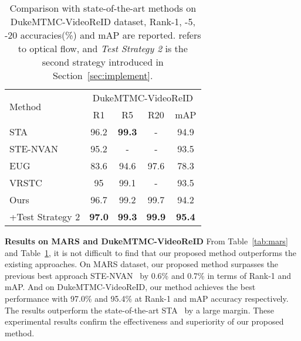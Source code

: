 \documentclass[journal]{IEEEtran}
\let\MYoriglatexcaption\caption
\renewcommand{\caption}[2][\relax]{\MYoriglatexcaption[#2]{#2}}
\begin{document}
\begin{table}[ht]
    \centering
        \begin{tabular}{ l | c | c | c | c }
            \hline
            \multirow{2}{*}{Method} & \multicolumn{4}{c}{DukeMTMC-VideoReID} \\\cline{2-5}
            & R1 & R5 & R20 & mAP\\ \hline
            STA \cite{Fu_2019_AAAI} & 96.2 & \textbf{99.3} & - & 94.9 \\
            STE-NVAN \cite{Liu_2019_BMVC} & 95.2 & - & - & 93.5 \\
            EUG\cite{Wu_2018_CVPR} & 83.6 & 94.6 & 97.6 & 78.3 \\
            VRSTC \cite{Hou_2019_CVPR}& 95 & 99.1 & - & 93.5 \\ \hline
            Ours & 96.7 & 99.2 & 99.7 & 94.2 \\
            \hspace{1em}+Test Strategy 2 & \textbf{97.0} & \textbf{99.3} & \textbf{99.9} & \textbf{95.4} \\ \hline
        \end{tabular}
        \vspace{0.5em}
    \caption{Comparison with state-of-the-art methods on DukeMTMC-VideoReID dataset, Rank-1, -5, -20 accuracies(\%) and mAP are reported.  refers to optical flow, and \textit{Test Strategy 2} is the second strategy introduced in Section~\ref{sec:implement}.}
    \label{tab:dukev}
\end{table}
\textbf{Results on MARS and DukeMTMC-VideoReID}
From Table~\ref{tab:mars} and Table~\ref{tab:dukev}, it is not difficult to find that our proposed method outperforms the existing approaches. On MARS dataset, our proposed method surpasses the previous best approach STE-NVAN~\cite{Liu_2019_BMVC} by 0.6\% and 0.7\% in terms of Rank-1 and mAP. And on DukeMTMC-VideoReID, our method achieves the best performance with 97.0\% and 95.4\% at Rank-1 and mAP accuracy respectively. The results outperform the state-of-the-art STA~\cite{Fu_2019_AAAI} by a large margin. These experimental results confirm the effectiveness and superiority of our proposed method.
\end{document}

